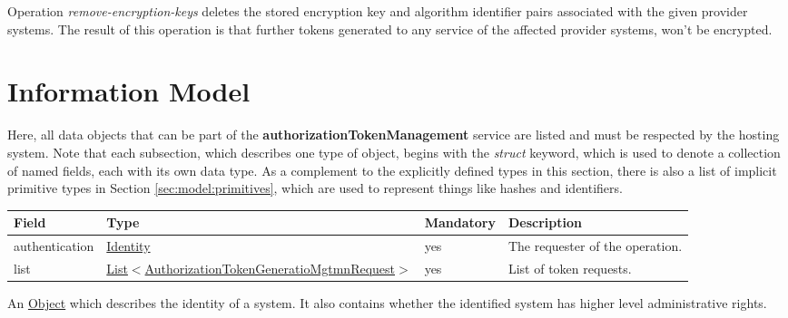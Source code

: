 \documentclass[a4paper]{arrowhead}
\newcommand{\pref}[1]{{\textcolor{ArrowheadGrey}{\hyperref[sec:model:primitives:#1]{#1}}}}
\begin{document}

Operation \textit{remove-encryption-keys} deletes the stored encryption key and algorithm identifier pairs associated with the given provider systems. The result of this operation is that further tokens generated to any service of the affected provider systems, won't be encrypted. 

\clearpage

\section{Information Model}
\label{sec:model}

Here, all data objects that can be part of the \textbf{authorizationTokenManagement} service are listed and must be respected by the hosting system.
Note that each subsection, which describes one type of object, begins with the \textit{struct} keyword, which is used to denote a collection of named fields, each with its own data type.
As a complement to the explicitly defined types in this section, there is also a list of implicit primitive types in Section \ref{sec:model:primitives}, which are used to represent things like hashes and identifiers.



\begin{table}[ht!]
\begin{tabularx}{\textwidth}{| p{3cm} | p{8cm} | p{2cm} | X |} \hline
\rowcolor{gray!33} Field & Type & Mandatory & Description \\ \hline
authentication & \hyperref[sec:model:Identity]{Identity} & yes & The requester of the operation. \\ \hline
list & \pref{List}$<$\hyperref[sec:model:AuthorizationTokenGeneratioMgtmnRequest]{AuthorizationTokenGeneratioMgtmnRequest}$>$ & yes & List of token requests. \\ \hline
\end{tabularx}
\end{table}


An \pref{Object} which describes the identity of a system. It also contains whether the identified system has higher level administrative rights.

\end{document}
